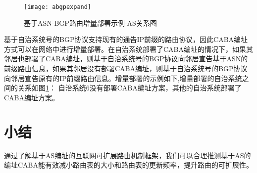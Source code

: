 \begin{figure}
  \centering
  \texttt{[image: abgpexpand]}
  \caption{基于ASN-BGP路由增量部署示例-AS关系图}
  \label{fig:abgpexpand}
\end{figure}

基于自治系统号的BGP协议支持现有的通告IP前缀的路由协议，因此CABA编址方式可以在网络中进行增量部署。在自治系统部署了CABA编址的情况下，如果其邻居也部署了CABA编址，则基于自治系统号的BGP协议向邻居宣告基于ASN的前缀路由信息，如果其邻居没有部署CABA编址，则基于自治系统号的BGP协议向邻居宣告原有的IP前缀路由信息。增量部署的示例如下,增量部署的自治系统之间的关系如图\ref{fig:abgpexpand}：
自治系统6没有部署CABA编址方案，其他的自治系统部署了CABA编址方案。

\section{小结}
通过了解基于AS编址的互联网可扩展路由机制框架，我们可以合理推测基于AS的编址CABA能有效减小路由表的大小和路由表的更新频率，提升路由的可扩展性。


